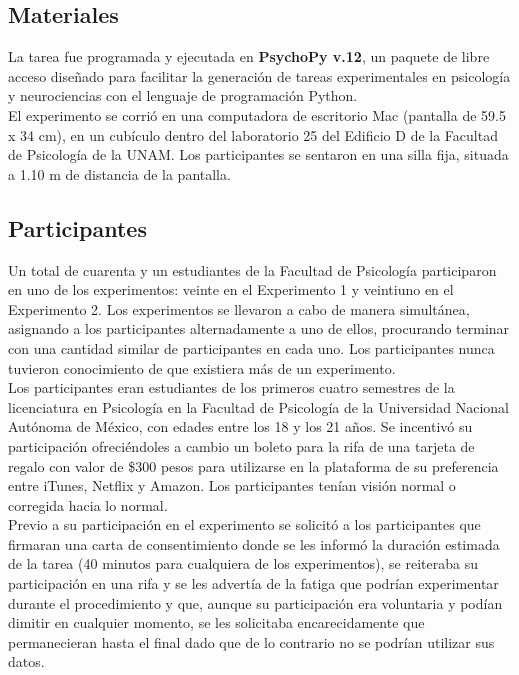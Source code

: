 \begin{itemize}
\subsection{Materiales}

La tarea fue programada y ejecutada en \textbf{PsychoPy v.12}, un paquete de libre acceso diseñado para facilitar la generación de tareas experimentales en psicología y neurociencias con el lenguaje de programación Python.\\

El experimento se corrió en una computadora de escritorio Mac (pantalla de 59.5 x 34 cm), en un cubículo dentro del laboratorio 25 del Edificio D de la Facultad de Psicología de la UNAM. Los participantes se sentaron en una silla fija, situada a 1.10 m de distancia de la pantalla.\\ 


\subsection{Participantes}

Un total de cuarenta y un estudiantes de la Facultad de Psicología participaron en uno de los experimentos: veinte en el Experimento 1 y veintiuno en el Experimento 2. Los experimentos se llevaron a cabo de manera simultánea, asignando a los participantes alternadamente a uno de ellos, procurando terminar con una cantidad similar de participantes en cada uno. Los participantes nunca tuvieron conocimiento de que existiera más de un experimento.\\

Los participantes eran estudiantes de los primeros cuatro semestres de la licenciatura en Psicología en la Facultad de Psicología de la Universidad Nacional Autónoma de México, con edades entre los 18 y los 21 años. Se incentivó su participación ofreciéndoles a cambio un boleto para la rifa de una tarjeta de regalo con valor de \$300 pesos para utilizarse en la plataforma de su preferencia entre iTunes, Netflix y Amazon. Los participantes tenían visión normal o corregida hacia lo normal.\\ 

Previo a su participación en el experimento se solicitó a los participantes que firmaran una carta de consentimiento donde se les informó la duración estimada de la tarea (40 minutos para cualquiera de los experimentos), se reiteraba su participación en una rifa y se les advertía de la fatiga que podrían experimentar durante el procedimiento y que, aunque su participación era voluntaria y podían dimitir en cualquier momento, se les solicitaba encarecidamente que permanecieran hasta el final dado que de lo contrario no se podrían utilizar sus datos.\\


\end{itemize}

